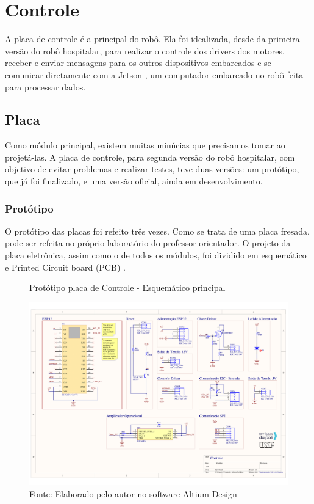 \documentclass[../delivery_hospital_report.tex]{subfiles}
\begin{document}
\clearpage
\section{Controle}

A placa de controle é a principal do robô. Ela foi idealizada, desde da primeira versão do robô hospitalar, para realizar o controle dos drivers dos motores, receber e enviar mensagens para os outros dispositivos embarcados e se comunicar diretamente com a Jetson \cite{jetson21}, um computador embarcado no robô feita para processar dados.

\subsection{Placa}

Como módulo principal, existem muitas minúcias que precisamos tomar ao projetá-las. A placa de controle, para segunda versão do robô hospitalar, com objetivo de evitar problemas e realizar testes, teve duas versões: um protótipo, que já foi finalizado, e uma versão oficial, ainda em desenvolvimento. 

\subsubsection{Protótipo}

O protótipo das placas foi refeito três vezes. Como se trata de uma placa fresada, pode ser refeita no próprio laboratório do professor orientador. O projeto da placa eletrônica, assim como o de todos os módulos, foi dividido em esquemático e Printed Circuit board (PCB) . 

\begin{figure}[!h]
\centering
    \caption{Protótipo placa de Controle - Esquemático principal }
    \centering %
    \includegraphics[width=17cm]{modulos/Controle_Motor-1.png}
    \caption*{Fonte: Elaborado pelo autor no software Altium Design\cite{altium21} }
    \label{Protótipo placa de ## - Esquemático principal}
\end{figure}
\end{document}
